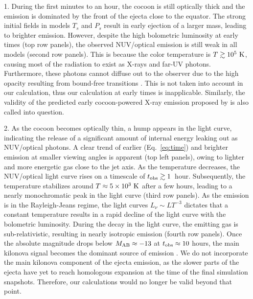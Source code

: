 \documentclass[twocolumn,dvipsnames]{aastex62}
\begin{document}
1. During the first minutes to an hour, the cocoon is still optically thick and the emission is dominated by the front of the ejecta close to the equator. The strong initial fields in models $ T_s $ and $ P_s $ result in early ejection of a larger mass, leading to brighter emission. However, despite the high bolometric luminosity at early times (top row panels), the observed NUV/optical emission is still weak in all models (second row panels). This is because the color temperature is $ T \gtrsim 10^5~{\rm K} $, causing most of the radiation to exist as X-rays and far-UV photons. Furthermore, these photons cannot diffuse out to the observer due to the high opacity resulting from bound-free transitions \citep{Metzger2019}. This is not taken into account in our calculation, thus our calculation at early times is inapplicable. Similarly, the validity of the predicted early cocoon-powered X-ray emission proposed by \citet{Lazzati2017b,Lazzati2017a,Hamidani2022} is also called into question.

2. As the cocoon becomes optically thin, a hump appears in the light curve, indicating the release of a significant amount of internal energy leaking out as NUV/optical photons. A clear trend of earlier (Eq.~\eqref{eq:time}) and brighter emission at smaller viewing angles is apparent (top left panels), owing to lighter and more energetic gas close to the jet axis. As the temperature decreases, the NUV/optical light curve rises on a timescale of $ t_{\rm obs} \gtrsim 1 $~hour. Subsequently, the temperature stabilizes around $ T \approx 5\times 10^3~{\rm K} $ after a few hours, leading to a nearly monochromatic peak in the light curve (third row panels). As the emission is in the Rayleigh-Jeans regime, the light curves $ L_\nu \sim LT^{-3} $ dictates that a constant temperature results in a rapid decline of the light curve with the bolometric luminosity. During the decay in the light curve, the emitting gas is sub-relativistic, resulting in nearly isotropic emission (fourth row panels). Once the absolute magnitude drops below $ M_{\rm AB} \approx -13 $ at $ t_{\rm obs} \approx 10 $ hours, the main kilonova signal becomes the dominant source of emission \citep[see e.g.,][]{Gompertz2023}. We do not incorporate the main kilonova component of the ejecta emission, as the slower parts of the ejecta have yet to reach homologous expansion at the time of the final simulation snapshots. Therefore, our calculations would no longer be valid beyond that point.
\end{document}
